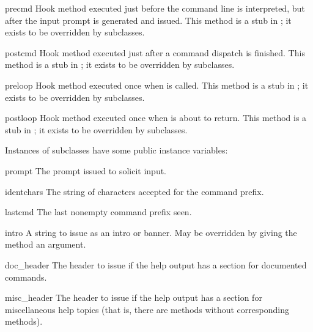 \begin{methoddesc}{precmd}{}
Hook method executed just before the command line is interpreted, but
after the input prompt is generated and issued.  This
method is a stub in ; it exists to be overridden by
subclasses.
\end{methoddesc}

\begin{methoddesc}{postcmd}{}
Hook method executed just after a command dispatch is finished.  This
method is a stub in ; it exists to be overridden by
subclasses.
\end{methoddesc}

\begin{methoddesc}{preloop}{}
Hook method executed once when  is called.  This
method is a stub in ; it exists to be overridden by
subclasses.
\end{methoddesc}

\begin{methoddesc}{postloop}{}
Hook method executed once when  is about to return.
This method is a stub in ; it exists to be overridden by
subclasses.
\end{methoddesc}

Instances of  subclasses have some public instance variables:

\begin{memberdesc}{prompt}
The prompt issued to solicit input.
\end{memberdesc}

\begin{memberdesc}{identchars}
The string of characters accepted for the command prefix.
\end{memberdesc}

\begin{memberdesc}{lastcmd}
The last nonempty command prefix seen. 
\end{memberdesc}

\begin{memberdesc}{intro}
A string to issue as an intro or banner.  May be overridden by giving
the  method an argument.
\end{memberdesc}

\begin{memberdesc}{doc_header}
The header to issue if the help output has a section for documented
commands.
\end{memberdesc}

\begin{memberdesc}{misc_header}
The header to issue if the help output has a section for miscellaneous 
help topics (that is, there are  methods without
corresponding  methods).
\end{memberdesc}

